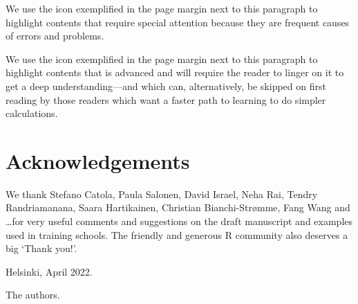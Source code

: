 We\Attention{} use the icon exemplified in the page margin next to this paragraph to highlight contents that require special attention because they are frequent causes of errors and problems.

We\Advanced{} use the icon exemplified in the page margin next to this paragraph to highlight contents that is advanced and will require the reader to linger on it to get a deep understanding---and which can, alternatively, be skipped on first reading by those readers which want a faster path to learning to do simpler calculations.

\section{Acknowledgements}

We thank Stefano Catola, Paula Salonen, David Israel, Neha Rai, Tendry Randriamanana, Saara Hartikainen, Christian Bianchi-Str{\o}mme, Fang Wang and \ldots for very useful comments and suggestions on the draft manuscript and examples used in training schools. The friendly and generous R community also deserves a big `Thank you!'.

Helsinki, April 2022.

The authors. 